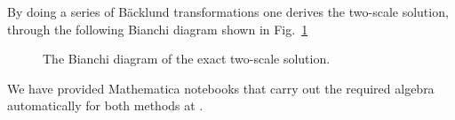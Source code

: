 \documentclass[%
reprint,
superscriptaddress,
amsmath,amssymb,
aps,
prd,
floatfix,
nofootinbib
]{revtex4-1}
\begin{document}
By doing a series of B\"acklund transformations one derives the two-scale solution, through the following Bianchi diagram shown in Fig.~\ref{bianchitwo}
\begin{figure}
\caption{The Bianchi diagram of the exact two-scale solution.}\label{bianchitwo}
\end{figure}

\medbreak
We have provided Mathematica notebooks that carry out the required algebra automatically for both methods at \cite{mathematica}.
\end{document}
